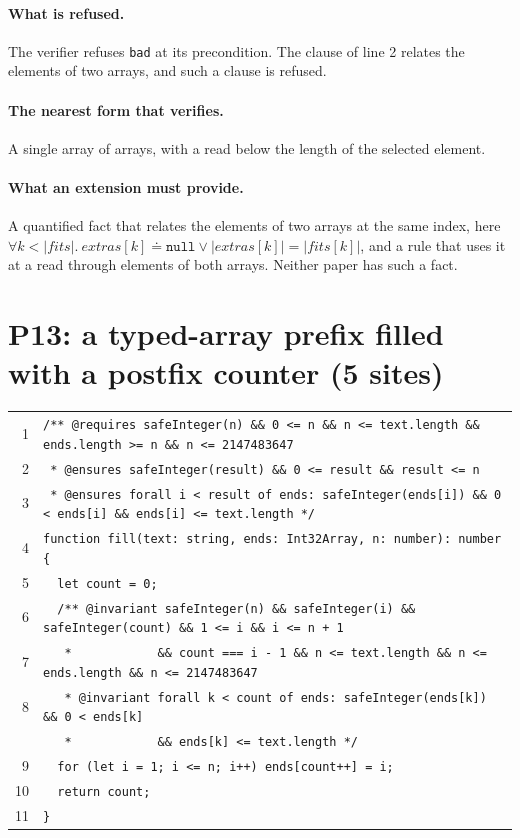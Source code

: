 \documentclass[10pt,a4paper]{article}
\theoremstyle{definition}
\theoremstyle{remark}
\newcommand{\len}[1]{|#1|}
\newcommand{\code}[1]{\texttt{#1}}
\newcommand{\entry}[1]{\paragraph{#1.}}
\begin{document}
\entry{What is refused} The verifier refuses \code{bad} at its
precondition. The clause of line 2 relates the elements of two arrays,
and such a clause is refused.

\entry{The nearest form that verifies} A single array of arrays, with a read below the length
of the selected element.

\entry{What an extension must provide} A quantified fact that relates the elements of two
arrays at the same index, here
$\forall k<\len{\mathit{fits}}.\ \mathit{extras}[k]\doteq\code{null}\vee\len{\mathit{extras}[k]}=\len{\mathit{fits}[k]}$,
and a rule that uses it at a read through elements of both arrays.
Neither paper has such a fact.

\section{P13: a typed-array prefix filled with a postfix counter (5 sites)}

{\footnotesize
\begin{tabular}{@{}r@{\hspace{1em}}l@{}}
1 & \code{/** @requires safeInteger(n) \&\& 0 <= n \&\& n <= text.length \&\& ends.length >= n \&\& n <= 2147483647} \\
2 & \code{~* @ensures safeInteger(result) \&\& 0 <= result \&\& result <= n} \\
3 & \code{~* @ensures forall i < result of ends: safeInteger(ends[i]) \&\& 0 < ends[i] \&\& ends[i] <= text.length */} \\
4 & \code{function fill(text: string, ends: Int32Array, n: number): number \{} \\
5 & \code{~~let count = 0;} \\
6 & \code{~~/** @invariant safeInteger(n) \&\& safeInteger(i) \&\& safeInteger(count) \&\& 1 <= i \&\& i <= n + 1} \\
7 & \code{~~~*~~~~~~~~~~~~\&\& count === i - 1 \&\& n <= text.length \&\& n <= ends.length \&\& n <= 2147483647} \\
8 & \code{~~~* @invariant forall k < count of ends: safeInteger(ends[k]) \&\& 0 < ends[k]} \\
  & \code{~~~*~~~~~~~~~~~~\&\& ends[k] <= text.length */} \\
9 & \code{~~for (let i = 1; i <= n; i++) ends[count++] = i;} \\
10 & \code{~~return count;} \\
11 & \code{\}} \\
\end{tabular}}
\end{document}
